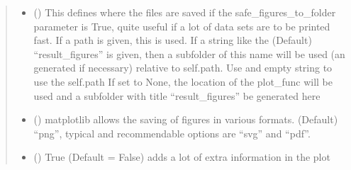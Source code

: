 \documentclass[letterpaper,10pt,english]{sphinxmanual}
\begin{document}
\begin{fulllineitems}
\begin{fulllineitems}
\begin{quote}
\begin{description}
\begin{itemize}
\begin{enumerate}
\item {} 
summed intensity

\item {} 
Kinetics

\item {} 
Spectra

\item {} 
Matrixes

\item {} 
Concentrations (the c\sphinxhyphen{}object)

\end{enumerate}

The plotting takes all parameter from the “ta” object unless otherwise specified


\item {} 
 (\sphinxstyleliteralemphasis{\sphinxupquote{, }}\sphinxstyleliteralemphasis{\sphinxupquote{, }}) \textendash{} This defines where the files are saved if the safe\_figures\_to\_folder parameter is True,
quite useful if a lot of data sets are to be printed fast.
If a path is given, this is used. If a string like the (Default) “result\_figures” is given,
then a subfolder of this name will be used (an generated if necessary)
relative to self.path. Use and empty string to use the self.path
If set to None, the location of the plot\_func will be used and
a subfolder with title “result\_figures” be generated here

\item {} 
 (\sphinxstyleliteralemphasis{\sphinxupquote{ (}}\sphinxstyleliteralemphasis{\sphinxupquote{)}}\sphinxstyleliteralemphasis{\sphinxupquote{, }}) \textendash{} matplotlib allows the saving of figures in various formats. (Default) “png”,
typical and recommendable options are “svg” and “pdf”.

\item {} 
 (\sphinxstyleliteralemphasis{\sphinxupquote{, }}) \textendash{} True (Default = False) adds a lot of extra information in the plot


\end{itemize}
\end{description}
\end{quote}
\end{fulllineitems}
\end{fulllineitems}
\end{document}
